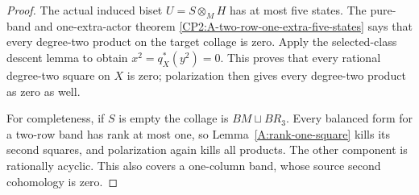 \begin{proof}
The actual induced biset $U=S\otimes_M H$ has at most five states.
The pure-band and one-extra-actor theorem
\ref{CP2:A-two-row-one-extra-five-states} says that every degree-two
product on the target collage is zero.  Apply the selected-class
descent lemma to obtain $x^2=q_X^*(y^2)=0$.
This proves that every rational degree-two square on $X$ is zero;
polarization then gives every degree-two product as zero as well.

For completeness, if $S$ is empty the collage is
$BM\sqcup BR_3$.  Every balanced form for a two-row band has rank
at most one, so Lemma~\ref{A:rank-one-square} kills its second
squares, and polarization again kills all products.  The other
component is rationally acyclic.  This also covers a one-column
band, whose source second cohomology is zero.
\end{proof}
